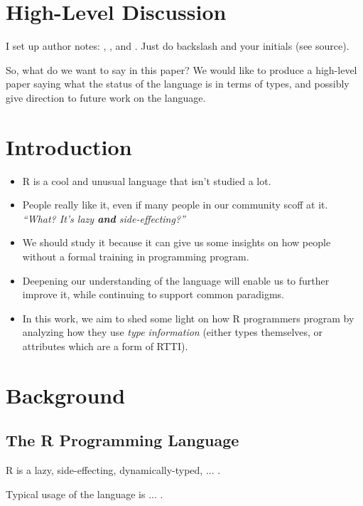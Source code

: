 
\section{High-Level Discussion}

I set up author notes:
, , and .
Just do backslash and your initials (see source).

So, what do we want to say in this paper?
We would like to produce a high-level paper saying what the status of the language is in terms of types, and possibly give direction to future work on the language.

%
%
%
%
%
%
\section{Introduction}



\begin{itemize}
    \item R is a cool and unusual language that isn't studied a lot.
    \item People really like it, even if many people in our community scoff at it. \textit{``What? It's lazy \textbf{and} side-effecting?''}
    \item We should study it because it can give us some insights on how people without a formal training in programming program.
    \item Deepening our understanding of the language will enable us to further improve it, while continuing to support common paradigms.
    \item In this work, we aim to shed some light on how R programmers program by analyzing how they use \textit{type information} (either types themselves, or attributes which are a form of RTTI).
\end{itemize}

%
%
%
%
%
%
\section{Background}

%
%
%
%
\subsection{The R Programming Language}

R is a lazy, side-effecting, dynamically-typed, ... .

Typical usage of the language is ... . 


